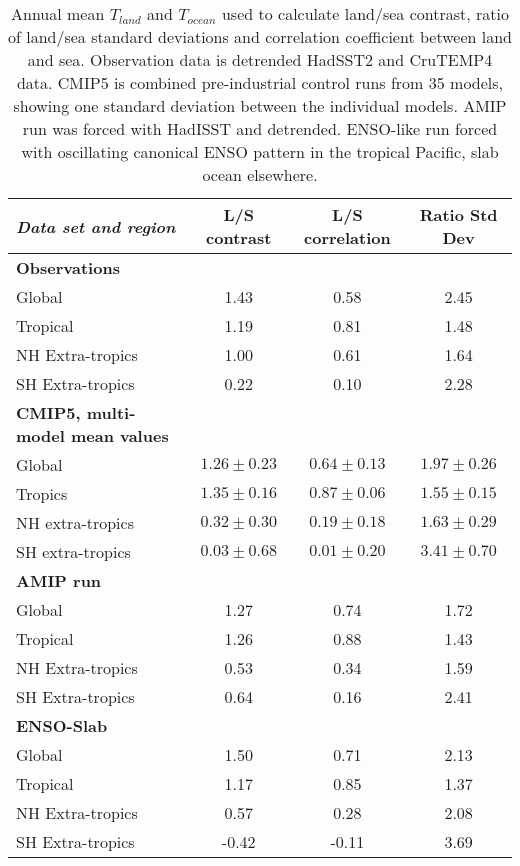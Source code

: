 \begin{center}
	\begin{table}[h]
		\caption{Annual mean $T_{land}$ and $T_{ocean}$ used to calculate land/sea 
			contrast, ratio of land/sea standard deviations and correlation 
			coefficient between land and sea. Observation data is detrended 
			HadSST2 and CruTEMP4 data. CMIP5 is combined pre-industrial control 
			runs from 35 models, showing one standard deviation between the 
		individual models.  AMIP run was forced with HadISST and detrended.  
	ENSO-like run forced with oscillating canonical ENSO pattern in the tropical 
Pacific, slab ocean elsewhere.}
		\label{tab:allstats}
		\scriptsize
	\begin{tabular}{ l  c  c  c }
		\textit{Data set and region}		& L/S contrast  & L/S correlation & Ratio 
		Std Dev\\ \hline
		\textbf{Observations}\\%
	Global  					& 1.43  & 0.58 & 2.45\\ %
	Tropical  				& 1.19  & 0.81 & 1.48\\ %
	NH Extra-tropics  & 1.00  & 0.61 & 1.64\\ %
	SH Extra-tropics  & 0.22  & 0.10 & 2.28\\ \hline
		\textbf{CMIP5, multi-model mean values}\\%
		Global				& $1.26 \pm 0.23$ & $0.64 \pm 0.13$ & $1.97 \pm 0.26$ \\
		Tropics 			& $1.35 \pm 0.16$ & $0.87 \pm 0.06$ & $1.55 \pm 0.15$ \\ NH 
		extra-tropics & $0.32 \pm 0.30$ & $0.19 \pm 0.18$ & $1.63 \pm 0.29$ \\ SH 
		extra-tropics & $0.03 \pm 0.68$ & $0.01 \pm 0.20$ & $3.41 \pm 0.70$ \\\hline 
		\textbf{AMIP run}\\%
	Global  					& 1.27 & 0.74 & 1.72\\ %
	Tropical  				& 1.26 & 0.88 & 1.43\\ %
	NH Extra-tropics  & 0.53 & 0.34 & 1.59\\ %
	SH Extra-tropics  & 0.64 & 0.16 & 2.41   %
		\\\hline \textbf{ENSO-Slab}\\%
	Global  					& 1.50 & 0.71 & 2.13 \\ %
	Tropical  				& 1.17 & 0.85 & 1.37 \\ %
	NH Extra-tropics  & 0.57 & 0.28 & 2.08 \\ %
	SH Extra-tropics  &-0.42 &-0.11 & 3.69 \\ \hline
	\end{tabular}
	\end{table}
\end{center}

